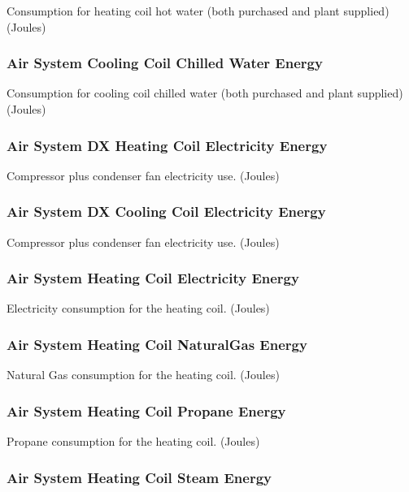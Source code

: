 Consumption for heating coil hot water (both purchased and plant supplied) (Joules)

\subsubsection{Air System Cooling Coil Chilled Water Energy}\label{air-system-cooling-coil-chilled-water-energy}

Consumption for cooling coil chilled water (both purchased and plant supplied) (Joules)

\subsubsection{Air System DX Heating Coil Electricity Energy}\label{air-system-dx-heating-coil-electric-energy}

Compressor plus condenser fan electricity use. (Joules)

\subsubsection{Air System DX Cooling Coil Electricity Energy}\label{air-system-dx-cooling-coil-electric-energy}

Compressor plus condenser fan electricity use. (Joules)

\subsubsection{Air System Heating Coil Electricity Energy}\label{air-system-heating-coil-electric-energy}

Electricity consumption for the heating coil. (Joules)

\subsubsection{Air System Heating Coil NaturalGas Energy}\label{air-system-heating-coil-gas-energy}

Natural Gas consumption for the heating coil. (Joules)

\subsubsection{Air System Heating Coil Propane Energy}\label{air-system-heating-coil-propane-energy}

Propane consumption for the heating coil. (Joules)

\subsubsection{Air System Heating Coil Steam Energy}\label{air-system-heating-coil-steam-energy}

